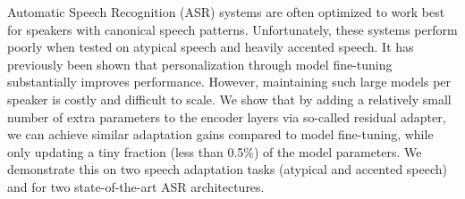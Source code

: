 Automatic Speech Recognition (ASR) systems are often optimized to work best for speakers with canonical speech patterns. Unfortunately, these systems perform poorly when tested on atypical speech and heavily accented speech. It has previously been shown that personalization through model fine-tuning substantially improves performance. However, maintaining such large models per speaker is costly and difficult to scale.  We show that by adding a relatively small number of extra parameters to the encoder layers via so-called residual adapter, we can achieve similar adaptation gains compared to model fine-tuning, while only updating a tiny fraction (less than 0.5\%) of the model parameters. We demonstrate this on two speech adaptation tasks (atypical and accented speech) and for two state-of-the-art ASR architectures.
